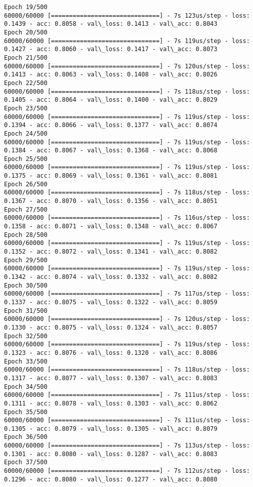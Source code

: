 \documentclass[11pt]{article}
\begin{document}
\begin{Verbatim}[commandchars=\\\{\}]
Epoch 19/500
60000/60000 [==============================] - 7s 123us/step - loss: 0.1439 - acc: 0.8058 - val\_loss: 0.1413 - val\_acc: 0.8043
Epoch 20/500
60000/60000 [==============================] - 7s 119us/step - loss: 0.1427 - acc: 0.8060 - val\_loss: 0.1417 - val\_acc: 0.8073
Epoch 21/500
60000/60000 [==============================] - 7s 120us/step - loss: 0.1413 - acc: 0.8063 - val\_loss: 0.1408 - val\_acc: 0.8026
Epoch 22/500
60000/60000 [==============================] - 7s 118us/step - loss: 0.1405 - acc: 0.8064 - val\_loss: 0.1400 - val\_acc: 0.8029
Epoch 23/500
60000/60000 [==============================] - 7s 119us/step - loss: 0.1394 - acc: 0.8066 - val\_loss: 0.1377 - val\_acc: 0.8074
Epoch 24/500
60000/60000 [==============================] - 7s 119us/step - loss: 0.1384 - acc: 0.8067 - val\_loss: 0.1368 - val\_acc: 0.8068
Epoch 25/500
60000/60000 [==============================] - 7s 119us/step - loss: 0.1375 - acc: 0.8069 - val\_loss: 0.1361 - val\_acc: 0.8081
Epoch 26/500
60000/60000 [==============================] - 7s 118us/step - loss: 0.1367 - acc: 0.8070 - val\_loss: 0.1356 - val\_acc: 0.8051
Epoch 27/500
60000/60000 [==============================] - 7s 116us/step - loss: 0.1358 - acc: 0.8071 - val\_loss: 0.1348 - val\_acc: 0.8067
Epoch 28/500
60000/60000 [==============================] - 7s 119us/step - loss: 0.1352 - acc: 0.8072 - val\_loss: 0.1341 - val\_acc: 0.8082
Epoch 29/500
60000/60000 [==============================] - 7s 119us/step - loss: 0.1342 - acc: 0.8074 - val\_loss: 0.1332 - val\_acc: 0.8082
Epoch 30/500
60000/60000 [==============================] - 7s 117us/step - loss: 0.1337 - acc: 0.8075 - val\_loss: 0.1322 - val\_acc: 0.8059
Epoch 31/500
60000/60000 [==============================] - 7s 120us/step - loss: 0.1330 - acc: 0.8075 - val\_loss: 0.1324 - val\_acc: 0.8057
Epoch 32/500
60000/60000 [==============================] - 7s 119us/step - loss: 0.1323 - acc: 0.8076 - val\_loss: 0.1320 - val\_acc: 0.8086
Epoch 33/500
60000/60000 [==============================] - 7s 118us/step - loss: 0.1317 - acc: 0.8077 - val\_loss: 0.1307 - val\_acc: 0.8083
Epoch 34/500
60000/60000 [==============================] - 7s 111us/step - loss: 0.1311 - acc: 0.8078 - val\_loss: 0.1303 - val\_acc: 0.8062
Epoch 35/500
60000/60000 [==============================] - 7s 111us/step - loss: 0.1305 - acc: 0.8079 - val\_loss: 0.1305 - val\_acc: 0.8079
Epoch 36/500
60000/60000 [==============================] - 7s 113us/step - loss: 0.1301 - acc: 0.8080 - val\_loss: 0.1287 - val\_acc: 0.8083
Epoch 37/500
60000/60000 [==============================] - 7s 112us/step - loss: 0.1296 - acc: 0.8080 - val\_loss: 0.1277 - val\_acc: 0.8080

\end{Verbatim}
\end{document}
